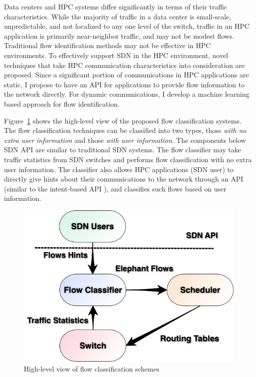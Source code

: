 Data centers and HPC systems differ significantly in terms of their traffic characteristics. While the majority of traffic in a data center is small-scale, unpredictable, and not localized to any one level of the switch, traffic in an HPC application is primarily near-neighbor traffic, and may not be modest flows. Traditional flow identification methods may not be effective
in HPC environments. To effectively support SDN in the HPC environment,
novel techniques that take HPC communication characteristics into
consideration are proposed. Since a significant portion of
communications in HPC applications are static, I propose to have an API for
applications to provide flow information to the network directly. For
dynamic communications, I develop a machine learning based approach for
flow identification.

Figure~\ref{fig:flow_schemes} shows the high-level view of the proposed
flow classification systems. The flow classification techniques can
be classified into two types, those {\em with no extra user information} and
those {\em with user information}. The components below SDN API are similar to
traditional SDN systems. The flow classifier may take traffic statistics from
SDN switches and performs flow classification with no extra user information.
The classifier also allows HPC applications (SDN user) to directly give
hints about their communications to the network through an API
(similar to the intent-based API \cite{Coflow2012}), and classifies
such flows based on user information.

\begin{figure}[h]
\centering
    \includegraphics[width=0.8\columnwidth]{figs/Fig3.png}
\caption{High-level view of flow classification schemes}
  \label{fig:flow_schemes}
\end{figure}

